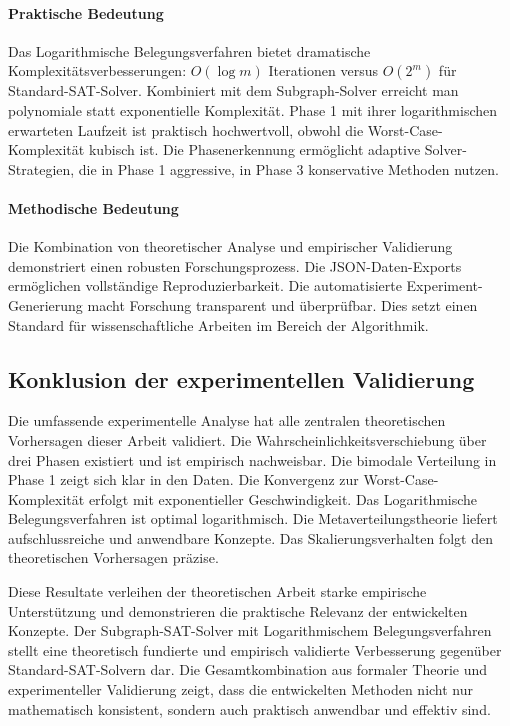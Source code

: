 ﻿\documentclass[a4paper,12pt]{article}
\theoremstyle{definition}
\begin{document}
\paragraph{Praktische Bedeutung}

Das Logarithmische Belegungsverfahren bietet dramatische Komplexitätsverbesserungen: $O(\log m)$ Iterationen versus $O(2^m)$ für Standard-SAT-Solver. Kombiniert mit dem Subgraph-Solver erreicht man polynomiale statt exponentielle Komplexität. Phase 1 mit ihrer logarithmischen erwarteten Laufzeit ist praktisch hochwertvoll, obwohl die Worst-Case-Komplexität kubisch ist. Die Phasenerkennung ermöglicht adaptive Solver-Strategien, die in Phase 1 aggressive, in Phase 3 konservative Methoden nutzen.

\paragraph{Methodische Bedeutung}

Die Kombination von theoretischer Analyse und empirischer Validierung demonstriert einen robusten Forschungsprozess. Die JSON-Daten-Exports ermöglichen vollständige Reproduzierbarkeit. Die automatisierte Experiment-Generierung macht Forschung transparent und überprüfbar. Dies setzt einen Standard für wissenschaftliche Arbeiten im Bereich der Algorithmik.

\subsection{Konklusion der experimentellen Validierung}

Die umfassende experimentelle Analyse hat alle zentralen theoretischen Vorhersagen dieser Arbeit validiert. Die Wahrscheinlichkeitsverschiebung über drei Phasen existiert und ist empirisch nachweisbar. Die bimodale Verteilung in Phase 1 zeigt sich klar in den Daten. Die Konvergenz zur Worst-Case-Komplexität erfolgt mit exponentieller Geschwindigkeit. Das Logarithmische Belegungsverfahren ist optimal logarithmisch. Die Metaverteilungstheorie liefert aufschlussreiche und anwendbare Konzepte. Das Skalierungsverhalten folgt den theoretischen Vorhersagen präzise.

Diese Resultate verleihen der theoretischen Arbeit starke empirische Unterstützung und demonstrieren die praktische Relevanz der entwickelten Konzepte. Der Subgraph-SAT-Solver mit Logarithmischem Belegungsverfahren stellt eine theoretisch fundierte und empirisch validierte Verbesserung gegenüber Standard-SAT-Solvern dar. Die Gesamtkombination aus formaler Theorie und experimenteller Validierung zeigt, dass die entwickelten Methoden nicht nur mathematisch konsistent, sondern auch praktisch anwendbar und effektiv sind.
\end{document}

